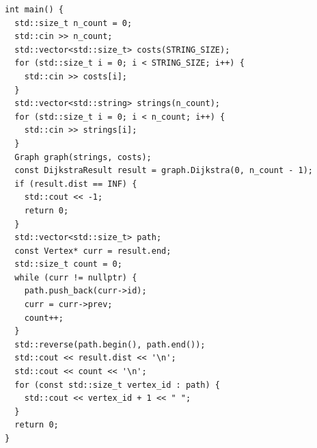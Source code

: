 \begin{lstlisting}
int main() {
  std::size_t n_count = 0;
  std::cin >> n_count;
  std::vector<std::size_t> costs(STRING_SIZE);
  for (std::size_t i = 0; i < STRING_SIZE; i++) {
    std::cin >> costs[i];
  }
  std::vector<std::string> strings(n_count);
  for (std::size_t i = 0; i < n_count; i++) {
    std::cin >> strings[i];
  }
  Graph graph(strings, costs);
  const DijkstraResult result = graph.Dijkstra(0, n_count - 1);
  if (result.dist == INF) {
    std::cout << -1;
    return 0;
  }
  std::vector<std::size_t> path;
  const Vertex* curr = result.end;
  std::size_t count = 0;
  while (curr != nullptr) {
    path.push_back(curr->id);
    curr = curr->prev;
    count++;
  }
  std::reverse(path.begin(), path.end());
  std::cout << result.dist << '\n';
  std::cout << count << '\n';
  for (const std::size_t vertex_id : path) {
    std::cout << vertex_id + 1 << " ";
  }
  return 0;
}
\end{lstlisting}
